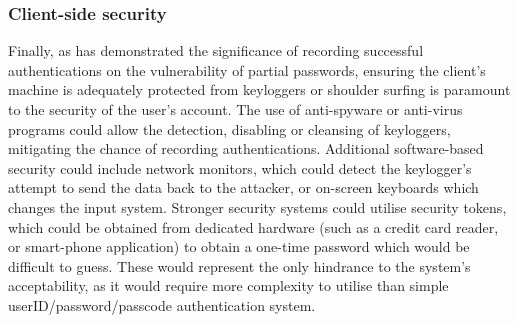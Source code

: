 \documentclass[british,10pt,a4paper]{article}
\begin{document}
\subsubsection{Client-side security}
Finally, as \citet{Aspinall2013-sh} has demonstrated the significance of recording successful authentications on the vulnerability of partial passwords, ensuring the client's machine is adequately protected from keyloggers or shoulder surfing is paramount to the security of the user's account. The use of anti-spyware or anti-virus programs could allow the detection, disabling or cleansing of keyloggers, mitigating the chance of recording authentications. Additional software-based security could include network monitors, which could detect the keylogger's attempt to send the data back to the attacker, or on-screen keyboards which changes the input system. Stronger security systems could utilise security tokens, which could be obtained from dedicated hardware (such as a credit card reader, or smart-phone application) to obtain a one-time password which would be difficult to guess. These would represent the only hindrance to the system's acceptability, as it would require more complexity to utilise than simple userID/password/passcode authentication system. 
\end{document}
